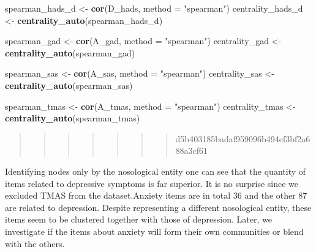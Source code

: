 \documentclass[
]{article}
\newenvironment{Shaded}{\begin{snugshade}}{\end{snugshade}}
\newcommand{\AttributeTok}[1]{\textcolor[rgb]{0.13,0.29,0.53}{#1}}
\newcommand{\FunctionTok}[1]{\textcolor[rgb]{0.13,0.29,0.53}{\textbf{#1}}}
\newcommand{\NormalTok}[1]{#1}
\newcommand{\OtherTok}[1]{\textcolor[rgb]{0.56,0.35,0.01}{#1}}
\newcommand{\StringTok}[1]{\textcolor[rgb]{0.31,0.60,0.02}{#1}}
\begin{document}
\begin{Shaded}
\begin{Highlighting}[]
\NormalTok{spearman\_hads\_d }\OtherTok{\textless{}{-}} \FunctionTok{cor}\NormalTok{(D\_hads, }\AttributeTok{method =} \StringTok{"spearman"}\NormalTok{)}
\NormalTok{centrality\_hads\_d }\OtherTok{\textless{}{-}} \FunctionTok{centrality\_auto}\NormalTok{(spearman\_hads\_d)}

\NormalTok{spearman\_gad }\OtherTok{\textless{}{-}} \FunctionTok{cor}\NormalTok{(A\_gad, }\AttributeTok{method =} \StringTok{"spearman"}\NormalTok{)}
\NormalTok{centrality\_gad }\OtherTok{\textless{}{-}} \FunctionTok{centrality\_auto}\NormalTok{(spearman\_gad)}

\NormalTok{spearman\_sas }\OtherTok{\textless{}{-}} \FunctionTok{cor}\NormalTok{(A\_sas, }\AttributeTok{method =} \StringTok{"spearman"}\NormalTok{)}
\NormalTok{centrality\_sas }\OtherTok{\textless{}{-}} \FunctionTok{centrality\_auto}\NormalTok{(spearman\_sas)}

\NormalTok{spearman\_tmas }\OtherTok{\textless{}{-}} \FunctionTok{cor}\NormalTok{(A\_tmas, }\AttributeTok{method =} \StringTok{"spearman"}\NormalTok{)}
\NormalTok{centrality\_tmas }\OtherTok{\textless{}{-}} \FunctionTok{centrality\_auto}\NormalTok{(spearman\_tmas)}
\end{Highlighting}
\end{Shaded}

\begin{quote}
\begin{quote}
\begin{quote}
\begin{quote}
\begin{quote}
\begin{quote}
\begin{quote}
d5b403185badaf959096b494ef3bf2a688a3cf61
\end{quote}
\end{quote}
\end{quote}
\end{quote}
\end{quote}
\end{quote}
\end{quote}

Identifying nodes only by the nosological entity one can see that the
quantity of items related to depressive symptoms is far superior. It is
no surprise since we excluded TMAS from the dataset.Anxiety items are in
total 36 and the other 87 are related to depression. Despite
representing a different nosological entity, these items seem to be
clustered together with those of depression. Later, we investigate if
the items about anxiety will form their own communities or blend with
the others.
\end{document}
